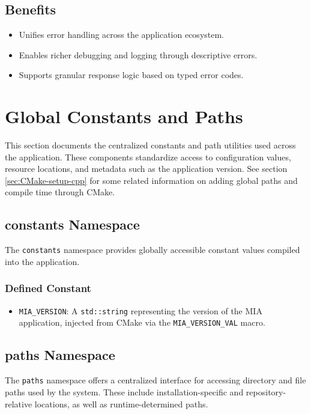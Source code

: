 \subsection*{Benefits}
\begin{itemize}
	\item Unifies error handling across the application ecosystem.
	\item Enables richer debugging and logging through descriptive errors.
	\item Supports granular response logic based on typed error codes.
\end{itemize}








\section{Global Constants and Paths}

This section documents the centralized constants and path utilities used across the application. These components standardize access to configuration values, resource locations, and metadata such as the application version. See section \ref{sec:CMake-setup-cpp} for some related information on adding global paths and compile time through CMake.

\subsection{constants Namespace}

The \texttt{constants} namespace provides globally accessible constant values compiled into the application.

\subsubsection*{Defined Constant}
\begin{itemize}
	\item \texttt{MIA\_VERSION}: A \texttt{std::string} representing the version of the MIA application, injected from CMake via the \texttt{MIA\_VERSION\_VAL} macro.
\end{itemize}

\subsection{paths Namespace}

The \texttt{paths} namespace offers a centralized interface for accessing directory and file paths used by the system. These include installation-specific and repository-relative locations, as well as runtime-determined paths.


